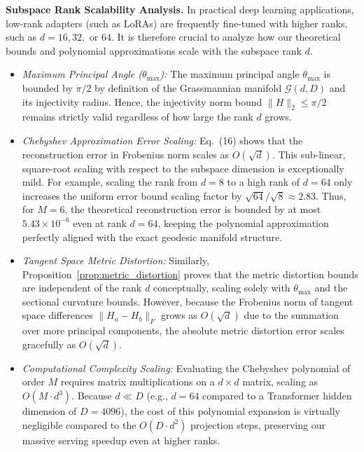 \begin{enumerate}
    \textbf{Subspace Rank Scalability Analysis.}
    In practical deep learning applications, low-rank adapters (such as LoRAs) are frequently fine-tuned with higher ranks, such as $d = 16, 32,$ or $64$. It is therefore crucial to analyze how our theoretical bounds and polynomial approximations scale with the subspace rank $d$. 
    \begin{itemize}
        \item \emph{Maximum Principal Angle ($\theta_{\max}$):} The maximum principal angle $\theta_{\max}$ is bounded by $\pi/2$ by definition of the Grassmannian manifold $\mathcal{G}(d, D)$ and its injectivity radius. Hence, the injectivity norm bound $\|H\|_2 \le \pi/2$ remains strictly valid regardless of how large the rank $d$ grows.
        \item \emph{Chebyshev Approximation Error Scaling:} Eq.~(16) shows that the reconstruction error in Frobenius norm scales as $O(\sqrt{d})$. This sub-linear, square-root scaling with respect to the subspace dimension is exceptionally mild. For example, scaling the rank from $d=8$ to a high rank of $d=64$ only increases the uniform error bound scaling factor by $\sqrt{64}/\sqrt{8} \approx 2.83$. Thus, for $M=6$, the theoretical reconstruction error is bounded by at most $5.43 \times 10^{-6}$ even at rank $d=64$, keeping the polynomial approximation perfectly aligned with the exact geodesic manifold structure.
        \item \emph{Tangent Space Metric Distortion:} Similarly, Proposition~\ref{prop:metric_distortion} proves that the metric distortion bounds are independent of the rank $d$ conceptually, scaling solely with $\theta_{\max}$ and the sectional curvature bounds. However, because the Frobenius norm of tangent space differences $\|H_a - H_b\|_F$ grows as $O(\sqrt{d})$ due to the summation over more principal components, the absolute metric distortion error scales gracefully as $O(\sqrt{d})$.
        \item \emph{Computational Complexity Scaling:} Evaluating the Chebyshev polynomial of order $M$ requires matrix multiplications on a $d \times d$ matrix, scaling as $O(M \cdot d^3)$. Because $d \ll D$ (e.g., $d=64$ compared to a Transformer hidden dimension of $D=4096$), the cost of this polynomial expansion is virtually negligible compared to the $O(D \cdot d^2)$ projection steps, preserving our massive serving speedup even at higher ranks.
    \end{itemize}
\end{enumerate}
